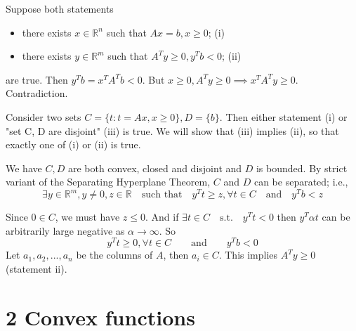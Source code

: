 \documentclass[12pt,letterpaper]{article}
\begin{document}
\begin{alphalist}
\item
    Suppose both statements
    \begin{itemize}
        \item there exists $x \in \mathbb{R}^n$ such that $Ax = b, x \ge 0$; (i)
        \item there exists $y \in \mathbb{R}^m$ such that $A^Ty \ge 0, y^Tb <
            0$; (ii)
    \end{itemize}

    are true. Then $y^Tb = x^TA^Tb < 0$. But $x \ge 0, A^Ty \ge 0 \implies
    x^TA^Ty \ge 0$. Contradiction.

    Consider two sets $C = \{t : t = Ax, x \ge 0\}, D = \{ b \}$. Then either
    statement (i) or "set C, D are disjoint" (iii) is true. We will show
    that (iii) implies (ii), so that exactly one of (i) or (ii) is true.

    We have $C, D$ are both convex, closed and disjoint and $D$ is bounded. By
    strict variant of the Separating Hyperplane Theorem, $C$ and $D$ can be
    separated; i.e.,
    \[
        \exists y \in \mathbb{R}^m, y \ne 0, z \in \mathbb{R} \quad \text{such
        that}\quad y^Tt \ge z, \forall t \in C \quad \text{and} \quad y^Tb < z
    \]

    Since $0 \in C$, we must have $z \le 0$. And if $\exists t \in C \quad
    \text{s.t.} \quad y^Tt < 0$ then $y^T\alpha{}t$ can be arbitrarily large negative
    as $\alpha \to \infty$. So
    \[
        y^Tt \ge 0, \forall t \in C  \qquad \text{and} \qquad y^Tb < 0
    \]
    Let $a_1, a_2,..., a_n$ be the columns of $A$, then $a_i \in C$. This
    implies $A^Ty \ge 0$ (statement ii).
\end{alphalist}

\newpage
\section*{2 Convex functions}
\end{document}
